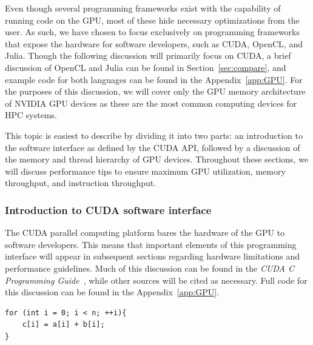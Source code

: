 Even though several programming frameworks exist with the capability of running code on the GPU, most of these hide necessary optimizations from the user.
As such, we have chosen to focus exclusively on programming frameworks that expose the hardware for software developers, such as CUDA, OpenCL, and Julia.
Though the following discussion will primarily focus on CUDA, a brief discussion of OpenCL and Julia can be found in Section~\ref{sec:compare}, and example code for both languages can be found in the Appendix~\ref{app:GPU}.
For the purposes of this discussion, we will cover only the GPU memory architecture of NVIDIA GPU devices as these are the most common computing devices for HPC systems.

This topic is easiest to describe by dividing it into two parts: an introduction to the software interface as defined by the CUDA API, followed by a discussion of the memory and thread hierarchy of GPU devices.
Throughout these sections, we will discuss performance tips to ensure maximum GPU utilization, memory throughput, and instruction throughput.

\subsubsection{Introduction to CUDA software interface}

The CUDA parallel computing platform bares the hardware of the GPU to software developers.
This means that important elements of this programming interface will appear in subsequent sections regarding hardware limitations and performance guidelines.
Much of this discussion can be found in the \textit{CUDA C Programming Guide}~\cite{CUDAPG}, while other sources will be cited as necessary.
Full code for this discussion can be found in the Appendix~\ref{app:GPU}.

\begin{lstlisting}[float,label=lst:vecadd,caption={An example of vector addition performed in C or C++ for $a$, $b$, and $c$, all of size $n$},style=c++]
for (int i = 0; i < n; ++i){
    c[i] = a[i] + b[i];
}
\end{lstlisting}

